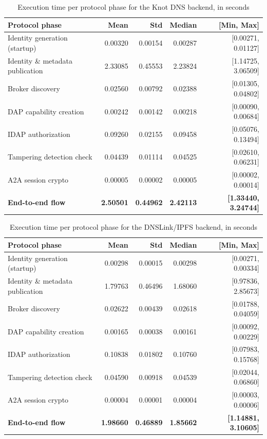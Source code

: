 \begin{table}[htb]
\centering
\caption{Execution time per protocol phase for the Knot DNS backend, in seconds}
\label{tab:phase-latency-knot_dns}
\begin{tabular}{lrrrr}
\toprule
\textbf{Protocol phase} & \textbf{Mean} & \textbf{Std} & \textbf{Median} & \textbf{[Min, Max]} \\
\midrule
Identity generation (startup)      & 0.00320 & 0.00154 & 0.00287 & [0.00271, 0.01127] \\
Identity \& metadata publication   & 2.33085 & 0.45553 & 2.23824 & [1.14725, 3.06509] \\
Broker discovery                   & 0.02560 & 0.00792 & 0.02388 & [0.01305, 0.04802] \\
DAP capability creation            & 0.00242 & 0.00142 & 0.00218 & [0.00090, 0.00684] \\
IDAP authorization                 & 0.09260 & 0.02155 & 0.09458 & [0.05076, 0.13494] \\
Tampering detection check          & 0.04439 & 0.01114 & 0.04525 & [0.02610, 0.06231] \\
A2A session crypto                 & 0.00005 & 0.00002 & 0.00005 & [0.00002, 0.00014] \\
\midrule
\textbf{End-to-end flow} & \textbf{2.50501} & \textbf{0.44962} & \textbf{2.42113} & \textbf{[1.33440, 3.24744]} \\
\bottomrule
\end{tabular}
\end{table}

\begin{table}[htb]
\centering
\caption{Execution time per protocol phase for the DNSLink/IPFS backend, in seconds}
\label{tab:phase-latency-dnslink_ipfs}
\begin{tabular}{lrrrr}
\toprule
\textbf{Protocol phase} & \textbf{Mean} & \textbf{Std} & \textbf{Median} & \textbf{[Min, Max]} \\
\midrule
Identity generation (startup)      & 0.00298 & 0.00015 & 0.00298 & [0.00271, 0.00334] \\
Identity \& metadata publication   & 1.79763 & 0.46496 & 1.68060 & [0.97836, 2.85673] \\
Broker discovery                   & 0.02622 & 0.00439 & 0.02618 & [0.01788, 0.04059] \\
DAP capability creation            & 0.00165 & 0.00038 & 0.00161 & [0.00092, 0.00229] \\
IDAP authorization                 & 0.10838 & 0.01802 & 0.10760 & [0.07983, 0.15768] \\
Tampering detection check          & 0.04590 & 0.00918 & 0.04539 & [0.02044, 0.06860] \\
A2A session crypto                 & 0.00004 & 0.00001 & 0.00004 & [0.00003, 0.00006] \\
\midrule
\textbf{End-to-end flow} & \textbf{1.98660} & \textbf{0.46889} & \textbf{1.85662} & \textbf{[1.14881, 3.10605]} \\
\bottomrule
\end{tabular}
\end{table}

